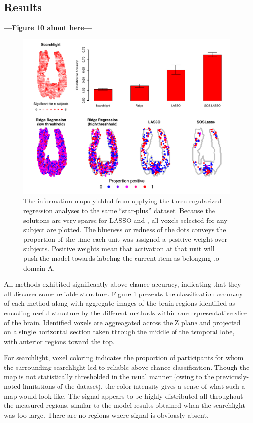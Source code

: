 \subsection{Results}
\textbf{---Figure 10 about here---}
\begin{figure}
\centering
\includegraphics[width=1\textwidth]{figures/cmu_all_results.eps}
\caption{\label{fig.brain}  The information maps yielded from applying the three regularized regression analyses to the same ``star-plus'' dataset. Because the solutions are very sparse for LASSO and \soslasso, all voxels selected for any subject are plotted. The blueness or redness of the dots conveys the proportion of the time each unit was assigned a positive weight over subjects. Positive weights mean that activation at that unit will push the model towards labeling the current item as belonging to domain A.}
\end{figure}

All methods exhibited significantly above-chance accuracy, indicating that they all discover some reliable structure. Figure \ref{fig.brain} presents the classification accuracy of each method along with aggregate images of the brain regions identified as encoding useful structure by the different methods within one representative slice of the brain.  Identified voxels are aggreagated across the Z plane and projected on a single horizontal section taken through the middle of the temporal lobe, with anterior regions toward the top. 

For searchlight, voxel coloring indicates the proportion of participants for whom the surrounding searchlight led to reliable above-chance classification. Though the map is not statistically thresholded in the usual manner (owing to the previously-noted limitations of the dataset), the color intensity gives a sense of what such a map would look like. The signal appears to be highly distributed all throughout the measured regions, similar to the model results obtained when the searchlight was too large. There are no regions where signal is obviously absent. 

